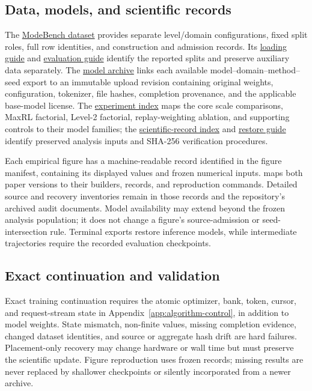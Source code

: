 \documentclass{article}
\newcommand{\1}{\mathbf 1}
\theoremstyle{remark}
\theoremstyle{definition}
\theoremstyle{plain}
\begin{document}
\subsection{Data, models, and scientific records}
\label{app:repro-artifacts}
\label{app:repro-code}
\label{app:archived-models}

The \href{https://huggingface.co/datasets/od2961/ModeBench}{ModeBench dataset}
provides separate level/domain configurations, fixed split roles, full row
identities, and construction and admission records. Its
\href{https://huggingface.co/datasets/od2961/ModeBench\#loading}{loading guide}
and \href{https://huggingface.co/datasets/od2961/ModeBench\#evaluation}{evaluation guide}
identify the reported splits and preserve auxiliary data separately.
The \href{https://huggingface.co/od2961/maxent-grpo-models}{model archive}
links each available model--domain--method--seed export to an immutable
upload revision containing original weights, configuration, tokenizer,
file hashes, completion provenance, and the applicable base-model license.
The \href{https://huggingface.co/od2961/maxent-grpo-models/blob/main/EXPERIMENTS.md}{experiment index}
maps the core scale comparisons, MaxRL factorial, Level-2 factorial,
replay-weighting ablation, and supporting controls to their model families;
the \href{https://huggingface.co/od2961/maxent-grpo-models/blob/main/DATA.md}{scientific-record index}
and \href{https://huggingface.co/od2961/maxent-grpo-models/blob/main/RESTORE.md}{restore guide}
identify preserved analysis inputs and SHA-256 verification procedures.

Each empirical figure has a machine-readable record identified in the
figure manifest, containing its displayed values and frozen numerical inputs.
 maps both paper versions to their builders,
records, and reproduction commands. Detailed source and recovery inventories
remain in those records and the repository's archived audit documents.
Model availability may extend beyond the frozen analysis population; it
does not change a figure's source-admission or seed-intersection rule.
Terminal exports restore inference models, while intermediate trajectories
require the recorded evaluation checkpoints.

\subsection{Exact continuation and validation}
\label{app:repro-recovery}

Exact training continuation requires the atomic optimizer, bank, token,
cursor, and request-stream state in Appendix~\ref{app:algorithm-control},
in addition to model weights. State mismatch, non-finite values, missing
completion evidence, changed dataset identities, and source or aggregate
hash drift are hard failures. Placement-only recovery may change hardware
or wall time but must preserve the scientific update. Figure reproduction
uses frozen records; missing results are never replaced by shallower
checkpoints or silently incorporated from a newer archive.
\end{document}
